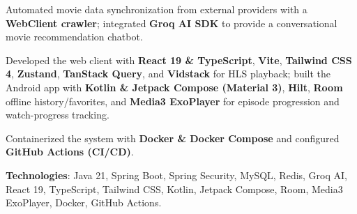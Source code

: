 \begin{cventries}
{\begin{cvitems}
        \item {Automated movie data synchronization from external providers with a \textbf{WebClient crawler}; integrated \textbf{Groq AI SDK} to provide a conversational movie recommendation chatbot.}
        \item {Developed the web client with \textbf{React 19 \& TypeScript}, \textbf{Vite}, \textbf{Tailwind CSS 4}, \textbf{Zustand}, \textbf{TanStack Query}, and \textbf{Vidstack} for HLS playback; built the Android app with \textbf{Kotlin \& Jetpack Compose (Material 3)}, \textbf{Hilt}, \textbf{Room} offline history/favorites, and \textbf{Media3 ExoPlayer} for episode progression and watch-progress tracking.}
        \item {Containerized the system with \textbf{Docker \& Docker Compose} and configured \textbf{GitHub Actions (CI/CD)}.}
        \item {\textbf{Technologies}: Java 21, Spring Boot, Spring Security, MySQL, Redis, Groq AI, React 19, TypeScript, Tailwind CSS, Kotlin, Jetpack Compose, Room, Media3 ExoPlayer, Docker, GitHub Actions.}
      \end{cvitems}
    }
\end{cventries}
